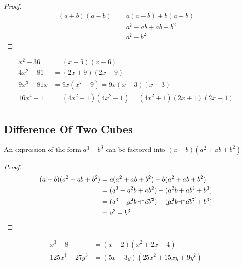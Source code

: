 \documentclass[english,course]{lecture}
\begin{document}
\begin{proof}
	\begin{align*}
		(a + b)(a - b)
		  & = a(a - b) + b(a - b) \\
		  & = a^2 - ab + ab -b^2  \\
		  & = a^2 - b^2
	\end{align*}
\end{proof}

\begin{example}[Factor]
	\begin{align*}
		x^2 - 36   & = (x + 6)(x - 6)                                    \\
		4x^2 - 81  & = (2x + 9)(2x - 9)                                  \\
		9x^3 - 81x & = 9x(x^2 - 9) = 9x(x + 3)(x - 3)                    \\
		16x^4 - 1  & = (4x^2 + 1)(4x^2 - 1) = (4x^2 + 1)(2x + 1)(2x - 1) \\
	\end{align*}
\end{example}

\subsection{Difference Of Two Cubes}

\begin{theorem}
	An expression of the form $a^3 - b^3$ can be factored into $(a - b)(a^2 + ab + b^2)$
\end{theorem}

\begin{proof}
	\begin{align*}
		(a-b)(a^2 + ab +b^2 )
		  & = a(a^2 + ab +b^2 ) - b(a^2 + ab +b^2 )                        \\
		  & = (a^3 + a^2 b + ab^2) - (a^2b + ab^2 + b^3)                   \\
		  & = (a^3 + \cancel{a^2 b + ab^2}) - (\cancel{a^2b + ab^2} + b^3) \\
		  & = a^3 - b^3
	\end{align*}
\end{proof}

\begin{example}[Factor]
	\begin{align*}
		x^3 - 8        & = (x - 2)(x^2 + 2x + 4)          \\
		125x^3 - 27y^3 & = (5x - 3y)(25x^2 + 15xy + 9y^2)
	\end{align*}
\end{example}
\end{document}
